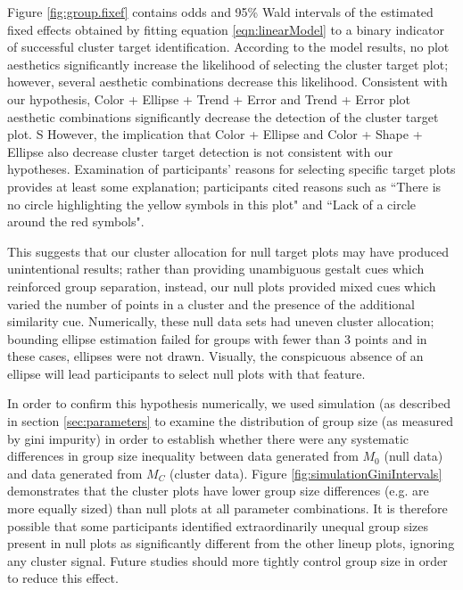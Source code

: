 \documentclass[11pt]{isuthesis}\usepackage[]{graphicx}\usepackage[]{color}
\begin{document}
Figure \ref{fig:group.fixef} contains odds and 95\% Wald intervals of the estimated fixed effects obtained by fitting equation \ref{eqn:linearModel} to a binary indicator of successful cluster target identification. 
According to the model results, no plot aesthetics significantly increase the likelihood of selecting the cluster target plot; however, several aesthetic combinations decrease this likelihood. Consistent with our hypothesis,  Color + Ellipse + Trend + Error and Trend + Error plot aesthetic combinations significantly decrease the detection of the cluster target plot. S
However, the implication that Color + Ellipse and Color + Shape + Ellipse also decrease cluster target detection is not consistent with our hypotheses. Examination of participants' reasons for selecting specific target plots provides at least some explanation; participants cited reasons such as 
``There is no circle highlighting the yellow symbols in this plot" %
and 
``Lack of a circle around the red symbols".  %

This suggests that our cluster allocation for null target plots may have produced unintentional results; rather than providing unambiguous gestalt cues which reinforced group separation, instead, our null plots provided mixed cues which varied the number of points in a cluster and the presence of the additional similarity cue. 
Numerically, these null data sets had uneven cluster allocation; bounding ellipse estimation failed for groups with fewer than 3 points and in these cases, ellipses were not drawn. 
Visually, the conspicuous absence of an ellipse will lead participants to select null plots with that feature.

In order to confirm this hypothesis numerically, we used simulation (as described in section \ref{sec:parameters} to examine the distribution of group size (as measured by gini impurity) in order to establish whether there were any systematic differences in group size inequality between data generated from $M_0$ (null data) and data generated from $M_C$ (cluster data). Figure \ref{fig:simulationGiniIntervals} demonstrates that the cluster plots have lower group size differences (e.g. are more equally sized) than null plots at all parameter combinations. It is therefore possible that some participants identified extraordinarily unequal group sizes present in null plots as significantly different from the other lineup plots, ignoring any cluster signal. Future studies should more tightly control group size in order to reduce this effect. 
\end{document}
